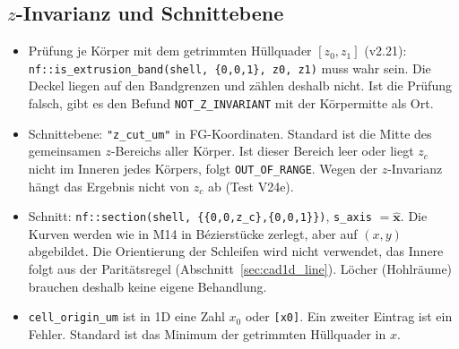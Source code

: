 \subsection{$z$-Invarianz und Schnittebene}
\begin{itemize}[nosep]
  \item Prüfung je Körper mit dem getrimmten Hüllquader $[z_0,z_1]$ (v2.21):
        \verb|nf::is_extrusion_band(shell, {0,0,1}, z0, z1)| muss wahr sein. Die Deckel liegen auf den Bandgrenzen und
        zählen deshalb nicht. Ist die Prüfung falsch, gibt es den Befund \verb|NOT_Z_INVARIANT| mit der Körpermitte als Ort.
  \item Schnittebene: \verb|"z_cut_um"| in FG-Koordinaten. Standard ist die Mitte des gemeinsamen $z$-Bereichs aller
        Körper. Ist dieser Bereich leer oder liegt $z_c$ nicht im Inneren jedes Körpers, folgt \verb|OUT_OF_RANGE|.
        Wegen der $z$-Invarianz hängt das Ergebnis nicht von $z_c$ ab (Test V24e).
  \item Schnitt: \verb|nf::section(shell, {{0,0,z_c},{0,0,1}})|, \verb|s_axis| $=\hat{\mathbf x}$. Die Kurven werden wie in
        M14 in Bézierstücke zerlegt, aber auf $(x,y)$ abgebildet. Die Orientierung der Schleifen wird nicht
        verwendet, das Innere folgt aus der Paritätsregel (Abschnitt~\ref{sec:cad1d_line}). Löcher (Hohlräume) brauchen
        deshalb keine eigene Behandlung.
  \item \verb|cell_origin_um| ist in 1D eine Zahl $x_0$ oder \verb|[x0]|. Ein zweiter Eintrag ist ein Fehler. Standard
        ist das Minimum der getrimmten Hüllquader in $x$.
\end{itemize}


